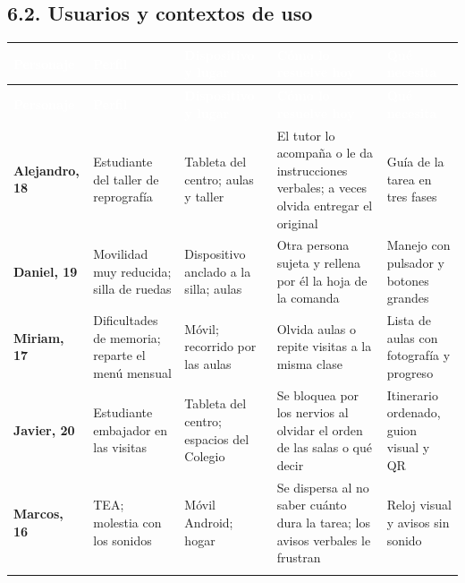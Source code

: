 \documentclass[11pt,a4paper]{article}
\newcommand{\hl}[1]{\textcolor{gblue}{\textbf{#1}}}
\begin{document}
\clearpage
\subsection*{6.2. Usuarios y contextos de uso}
{\small\setlength{\LTleft}{0pt}\setlength{\LTright}{0pt}
\begin{longtable}{@{}>{\raggedright\arraybackslash}p{}>{\raggedright\arraybackslash}p{}>{\raggedright\arraybackslash}p{}>{\raggedright\arraybackslash}p{}>{\raggedright\arraybackslash}p{}@{}}
\rowcolor{gblue}\textcolor{white}{\textbf{Personaje}} & \textcolor{white}{\textbf{Perfil}} & \textcolor{white}{\textbf{Dispositivo y lugar}} & \textcolor{white}{\textbf{Cómo lo resuelve hoy}} & \textcolor{white}{\textbf{Qué necesita}} \\
\endfirsthead
\rowcolor{gblue}\textcolor{white}{\textbf{Personaje}} & \textcolor{white}{\textbf{Perfil}} & \textcolor{white}{\textbf{Dispositivo y lugar}} & \textcolor{white}{\textbf{Cómo lo resuelve hoy}} & \textcolor{white}{\textbf{Qué necesita}} \\
\endhead
\hl{Alejandro, 18} & Estudiante del taller de reprografía & Tableta del centro; aulas y taller & El tutor lo acompaña o le da instrucciones verbales; a veces olvida entregar el original & Guía de la tarea en tres fases \\ \arrayrulecolor{gline}\hline
\rowcolor{glight}
\hl{Daniel, 19} & Movilidad muy reducida; silla de ruedas & Dispositivo anclado a la silla; aulas & Otra persona sujeta y rellena por él la hoja de la comanda & Manejo con pulsador y botones grandes \\ \arrayrulecolor{gline}\hline
\hl{Miriam, 17} & Dificultades de memoria; reparte el menú mensual & Móvil; recorrido por las aulas & Olvida aulas o repite visitas a la misma clase & Lista de aulas con fotografía y progreso \\ \arrayrulecolor{gline}\hline
\rowcolor{glight}
\hl{Javier, 20} & Estudiante embajador en las visitas & Tableta del centro; espacios del Colegio & Se bloquea por los nervios al olvidar el orden de las salas o qué decir & Itinerario ordenado, guion visual y QR \\ \arrayrulecolor{gline}\hline
\hl{Marcos, 16} & TEA; molestia con los sonidos & Móvil Android; hogar & Se dispersa al no saber cuánto dura la tarea; los avisos verbales le frustran & Reloj visual y avisos sin sonido \\ \arrayrulecolor{gline}\hline

\end{longtable}}
\end{document}
